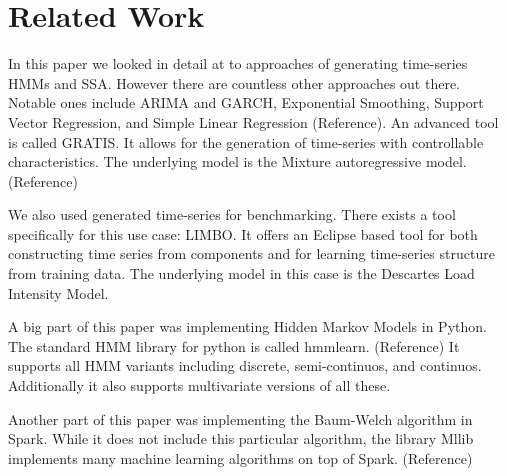 \chapter{Related Work}\label{chapter:related}

In this paper we looked in detail at to approaches of generating time-series HMMs and SSA. However there are countless other approaches out there. Notable ones include ARIMA and GARCH, Exponential Smoothing, Support Vector Regression, and Simple Linear Regression (Reference). An advanced tool is called GRATIS. It allows for the generation of time-series with controllable characteristics. The underlying model is the Mixture autoregressive model. (Reference)

We also used generated time-series for benchmarking. There exists a tool specifically for this use case: LIMBO. It offers an Eclipse based tool for both constructing time series from components and for learning time-series structure from training data. The underlying model in this case is the Descartes Load Intensity Model. \parencite{v2014limbo}

A big part of this paper was implementing Hidden Markov Models in Python. The standard HMM library for python is called hmmlearn. (Reference) It supports all HMM variants including discrete, semi-continuos, and continuos. Additionally it also supports multivariate versions of all these. 

Another part of this paper was implementing the Baum-Welch algorithm in Spark. While it does not include this particular algorithm, the library Mllib implements many machine learning algorithms on top of Spark. (Reference)